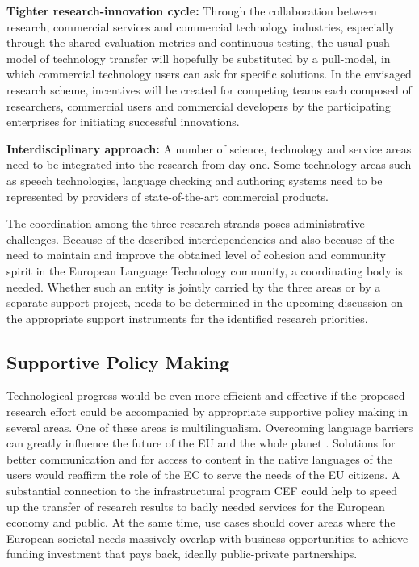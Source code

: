 \documentclass[10pt, plain]{../../metanetpaper}
\begin{document}
\begin{multicols}{2}
\textbf{Tighter research-innovation cycle:} Through the collaboration between research, commercial services and commercial technology industries, especially through the shared evaluation metrics and continuous testing, the usual push-model of technology transfer will hopefully be substituted by a pull-model, in which commercial technology users can ask for specific solutions. In the envisaged research scheme, incentives will be created for competing teams each composed of researchers, commercial users and commercial developers by the participating enterprises for initiating successful innovations.

\textbf{Interdisciplinary approach:} A number of science, technology and service areas need to be integrated into the research from day one. Some technology areas such as speech technologies, language checking and authoring systems need to be represented by providers of state-of-the-art commercial products.

The coordination among the three research strands poses administrative challenges. Because of the described interdependencies and also because of the need to maintain and improve the obtained level of cohesion and community spirit in the European Language Technology community, a coordinating body is needed. Whether such an entity is jointly carried by the three areas or by a separate support project, needs to be determined in the upcoming discussion on the appropriate support instruments for the identified research priorities.

\subsection[Supportive Policy Making]{Supportive Policy Making}
\label{sec:policy-making}

Technological progress would be even more efficient and effective if the proposed research effort could be accompanied by appropriate supportive policy making in several areas. One of these areas is multilingualism. Overcoming language barriers can greatly influence the future of the EU and the whole planet \cite{maaya2012,ifa2008,ifa2011}. Solutions for better communication and for access to content in the native languages of the users would reaffirm the role of the EC to serve the needs of the EU citizens. A substantial connection to the infrastructural program CEF could help to speed up the transfer of research results to badly needed services for the European economy and public. At the same time, use cases should cover areas where the European societal needs massively overlap with business opportunities to achieve funding investment that pays back, ideally public-private partnerships.


\end{multicols}
\end{document}
